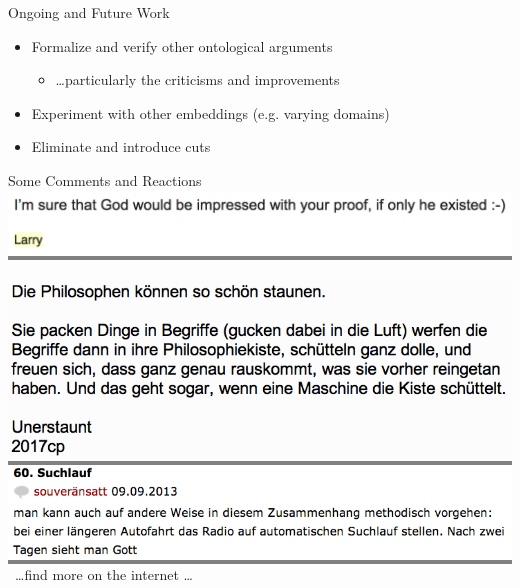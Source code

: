 \begin{frame}{Ongoing and Future Work} \large
\begin{itemize}
\item Formalize and verify other ontological arguments
  \begin{itemize}
  \item \ldots particularly the criticisms and improvements
  \end{itemize}
\item Experiment with other embeddings (e.g. varying domains)
\item Eliminate and introduce cuts
\end{itemize}
\end{frame}


\begin{frame}{Some Comments and Reactions}
\colorbox{gray}{\includegraphics[width=.8\textwidth]{Images/Comments/Comment1}}\\[.7em]

\, \hfill \colorbox{gray}{\includegraphics[width=.7\textwidth]{Images/Comments/Comment2}}\\[.7em]

\colorbox{gray}{\includegraphics[width=.8\textwidth]{Images/Comments/Comment3}}\\[1em]

\, \hfill \ldots find more on the internet \ldots
\end{frame}

